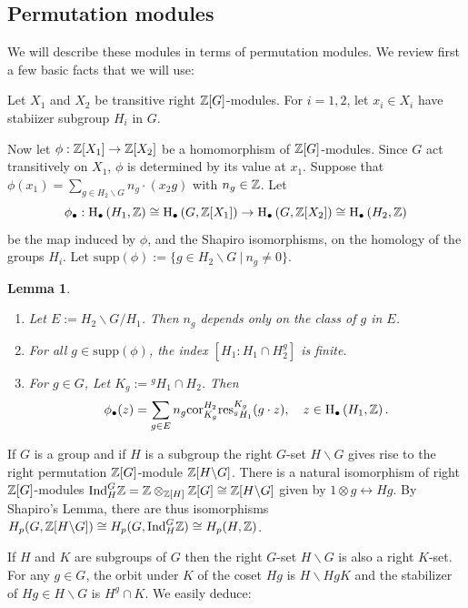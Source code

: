 \documentclass[12pt]{amsart}
\newtheorem{lem}{Lemma}[section]
\theoremstyle{definition}
\newcommand{\Z}{\Bbb{Z}}
\newcommand{\<}{\langle}
\renewcommand{\>}{\rangle}
\newcommand{\supp}[1]{\mathrm{supp}(#1)}
\newcommand{\ho}[3]{\mathrm{H}_{#1}\left( #2,#3 \right)}
\newcommand{\Cor}[2]{\mathrm{cor}_{#1}^{#2}}
\newcommand{\Res}[2]{\mathrm{res}_{#1}^{#2}}
\begin{document}
\subsection{Permutation modules}\label{sub:oerm} We will describe these modules in terms of permutation modules. We review first a few basic facts that we will use:



Let $X_1$ and $X_2$ be transitive right $\Z[G]$-modules. For $i=1,2$, let $x_i\in X_i$ have stabiizer subgroup $H_i$ in $G$.

Now let $\phi:\Z[X_1]\to \Z[X_2]$ be a homomorphism of $\Z[G]$-modules.  Since $G$ act transitively on $X_1$, $\phi$ is determined by its value at $x_1$. Suppose that 
$\phi(x_1)=\sum_{g\in H_2\backslash G}n_g\cdot (x_2g)$ with $n_g\in \Z$.  Let 
\[
\phi_\bullet:\ho{\bullet}{H_1}{\Z}\cong \ho{\bullet}{G}{\Z[X_1]}\to\ho{\bullet}{G}{\Z[X_2]}\cong\ho{\bullet}{H_2}{\Z}
\]
be the map induced by $\phi$, and the Shapiro isomorphisms, on the homology of the groups $H_i$. Let $\supp{\phi}:=\{ g\in H_2\backslash G\ |\ n_g\not=0\}$.
\begin{lem}\label{lem:phi}\cite[Lemma 3]{hut:mat}
\begin{enumerate}
\item Let $E:=H_2\backslash G/H_1$. Then $n_g$ depends only on the class of $g$ in $E$.
\item For all $g\in \supp{\phi}$, the index $[H_1:H_1\cap H_2^g]$ is finite.
\item For $g\in G$, Let $K_g:={}^gH_1\cap H_2$. Then 
\[
\phi_\bullet(z)=\sum_{g\in E}n_g\Cor{K_g}{H_2}\Res{^gH_1}{K_g}(g\cdot z), \quad z\in \ho{\bullet}{H_1}{\Z}.
\]
\end{enumerate}
\end{lem}

If $G$ is a group and if $H$ is a subgroup the right $G$-set $H\backslash G$ gives rise to the right permutation $\Z[G]$-module $\Z[H\backslash G]$. There is a natural isomorphism of right 
$\Z[G]$-modules $\mathrm{Ind}^G_H \Z=\Z\otimes_{\Z[H]}\Z[G]\cong \Z[H\backslash G]$ given by $1\otimes g\leftrightarrow Hg$.  By Shapiro's Lemma, there are thus isomorphisms 
$H_p(G,\Z[H\backslash G])\cong H_p(G,\mathrm{Ind}^G_H\Z)\cong H_p(H,\Z)$.

If $H$ and $K$ are subgroups of $G$  then the right $G$-set $H\backslash G$ is also a right $K$-set. For any $g\in G$, the orbit under $K$ of the coset $Hg$ is $H\backslash Hg{K}$ and the stabilizer of $Hg\in H\backslash G$ is $H^g\cap K$. We easily deduce:
\end{document}
